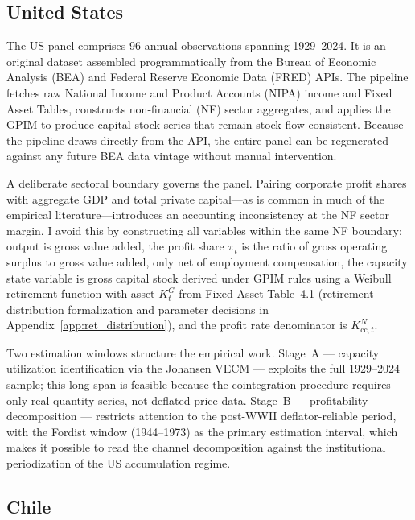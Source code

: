 \documentclass[11pt,a4paper]{article}
\begin{document}
{\subsection{United States}
\label{sec:data:us}

The US panel comprises 96 annual observations spanning 1929--2024. It is an original dataset assembled programmatically from the Bureau of Economic Analysis (BEA) and Federal Reserve Economic Data (FRED) APIs. The pipeline fetches raw National Income and Product Accounts (NIPA) income and Fixed Asset Tables, constructs non-financial (NF) sector aggregates, and applies the GPIM to produce capital stock series that remain stock-flow consistent. Because the pipeline draws directly from the API, the entire panel can be regenerated against any future BEA data vintage without manual intervention.

A deliberate sectoral boundary governs the panel. Pairing corporate profit shares with aggregate GDP and total private capital---as is common in much of the empirical literature---introduces an accounting inconsistency at the NF sector margin. I avoid this by constructing all variables within the same NF boundary: output is gross value added, the profit share $\pi_t$ is the ratio of gross operating surplus to gross value added, only net of employment compensation, the capacity state variable is gross capital stock derived under \citet{Shaikh2016} GPIM rules using a Weibull retirement function with asset $K^G_t$ from Fixed Asset Table~4.1 (retirement distribution formalization and parameter decisions in Appendix~\ref{app:ret_distribution}), and the profit rate denominator is $K^N_{\text{cc},t}$.

Two estimation windows structure the empirical work. Stage~A --- capacity utilization identification via the Johansen VECM --- exploits the full 1929--2024 sample; this long span is feasible because the cointegration procedure requires only real quantity series, not deflated price data. Stage~B --- profitability decomposition --- restricts attention to the post-WWII deflator-reliable period, with the Fordist window (1944--1973) as the primary estimation interval, which makes it possible to read the channel decomposition against the institutional periodization of the US accumulation regime. 

\subsection{Chile}
\label{sec:data:cl}

}
\end{document}
